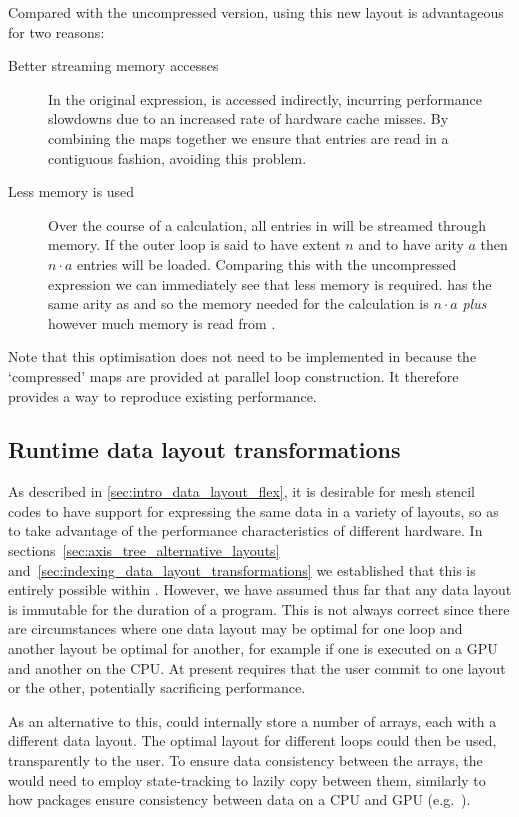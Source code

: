 \documentclass[thesis]{subfiles}
\begin{document}
Compared with the uncompressed version, using this new layout is advantageous for two reasons:
\begin{description}
  \item[Better streaming memory accesses]
    In the original expression,  is accessed indirectly, incurring performance slowdowns due to an increased rate of hardware cache misses.
    By combining the maps together we ensure that entries are read in a contiguous fashion, avoiding this problem.
  \item[Less memory is used]
    Over the course of a calculation, all entries in  will be streamed through memory.
    If the outer loop is said to have extent $n$ and  to have arity $a$ then $n\cdot a$ entries will be loaded.
    Comparing this with the uncompressed expression we can immediately see that less memory is required.
     has the same arity as  and so the memory needed for the calculation is $n\cdot a$ \emph{plus} however much memory is read from .
\end{description}

Note that this optimisation does not need to be implemented in  because the `compressed' maps are provided at parallel loop construction.
It therefore provides a way to reproduce existing  performance.

\subsection{Runtime data layout transformations}

As described in \cref{sec:intro_data_layout_flex}, it is desirable for mesh stencil codes to have support for expressing the same data in a variety of layouts, so as to take advantage of the performance characteristics of different hardware.
In sections~\ref{sec:axis_tree_alternative_layouts} and~\ref{sec:indexing_data_layout_transformations} we established that this is entirely possible within .
However, we have assumed thus far that any data layout is immutable for the duration of a program.
This is not always correct since there are circumstances where one data layout may be optimal for one loop and another layout be optimal for another, for example if one is executed on a GPU and another on the CPU.
At present  requires that the user commit to one layout or the other, potentially sacrificing performance.

As an alternative to this,   could internally store a number of arrays, each with a different data layout.
The optimal layout for different loops could then be used, transparently to the user.
To ensure data consistency between the arrays, the  would need to employ state-tracking to lazily copy between them, similarly to how packages ensure consistency between data on a CPU and GPU (e.g.~\cite{millsPerformancePortablePETScGPUbased2020}).
\end{document}
